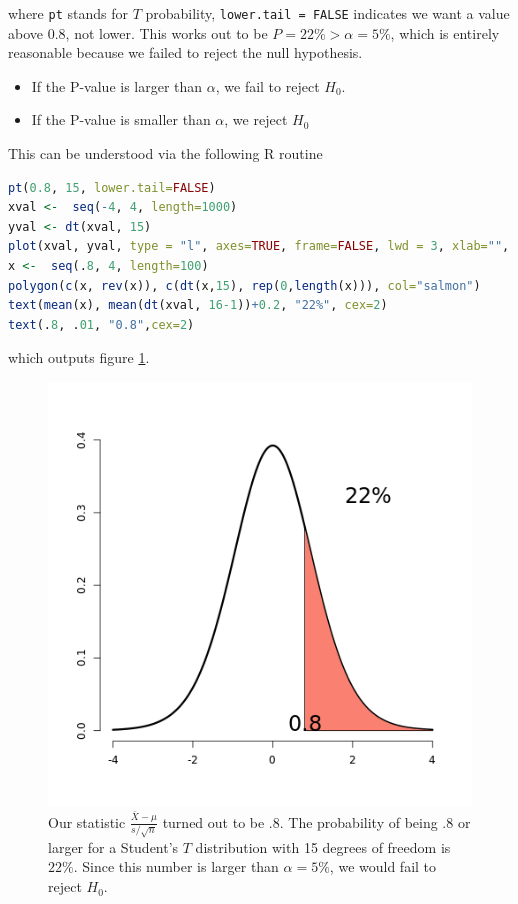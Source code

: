 \documentclass{homework}
\begin{document}
where \texttt{pt} stands for $T$ probability, \texttt{lower.tail = FALSE} indicates we want a value above $0.8$, not lower. This works out to be $P = 22\% > \alpha = 5\%$, which is entirely reasonable because we failed to reject the null hypothesis. 

\begin{itemize}
    \item If the P-value is larger than $\alpha$, we fail to reject $H_0$. 
    \item If the P-value is smaller than $\alpha$, we reject $H_0$
\end{itemize}

This can be understood via the following R routine 

\begin{lstlisting}[language=R]
pt(0.8, 15, lower.tail=FALSE)
xval <-  seq(-4, 4, length=1000)
yval <- dt(xval, 15)
plot(xval, yval, type = "l", axes=TRUE, frame=FALSE, lwd = 3, xlab="", ylab= "")
x <-  seq(.8, 4, length=100)
polygon(c(x, rev(x)), c(dt(x,15), rep(0,length(x))), col="salmon")
text(mean(x), mean(dt(xval, 16-1))+0.2, "22%", cex=2)
text(.8, .01, "0.8",cex=2)
\end{lstlisting}

which outputs figure \ref{fig: P-value T statistic}.

\begin{figure}
    \centering
    \includegraphics[scale = .4]{figs/P-value T statistic.png}
    \caption{Our statistic $\frac{\bar{X}-\mu}{s/\sqrt{n}}$ turned out to be .8. The probability of being .8 or larger for a Student's $T$ distribution with 15 degrees of freedom is $22\%$. Since this number is larger than $\alpha = 5\%$, we would fail to reject $H_0$. }
    \label{fig: P-value T statistic}
\end{figure}
\end{document}
